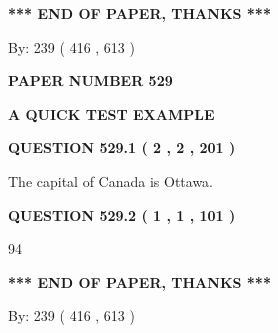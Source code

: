 \documentclass[12pt]{article}
\begin{document}
\vspace{1.0in} 
{\textbf{\large{ *** END OF PAPER, THANKS *** }}} 
   
   
\hspace{1.0in} By: 
 239 ( 416 ,  613 )
   
   
   
   
\newpage 
\setcounter{page}{ 
   529001 } 
   
   
   
   
 {\textbf{ \Large{ PAPER NUMBER  529  }}}
   
   
\vspace{0.2in}
   
   
   
   
   
   
 \vspace{0.2in}
{\LARGE {\textbf{ A QUICK TEST EXAMPLE}}}
   
   
  
\vspace{0.2in}
  
{\textbf{\Large{QUESTION
529.1 
 ( 2 , 2 , 201 )
}}}
  
  
 
 
\noindent{}
 
 
The capital of Canada is Ottawa.
 
 
 
 
  
\vspace{0.2in}
  
{\textbf{\Large{QUESTION
529.2 
 ( 1 , 1 , 101 )
}}}
  
  
 
 
\noindent{}

94
 
 
   
   
 \vspace{0.2in}
 
   
   
   
   
\vspace{1.0in} 
{\textbf{\large{ *** END OF PAPER, THANKS *** }}} 
   
   
\hspace{1.0in} By: 
 239 ( 416 ,  613 )
   
\end{document}
